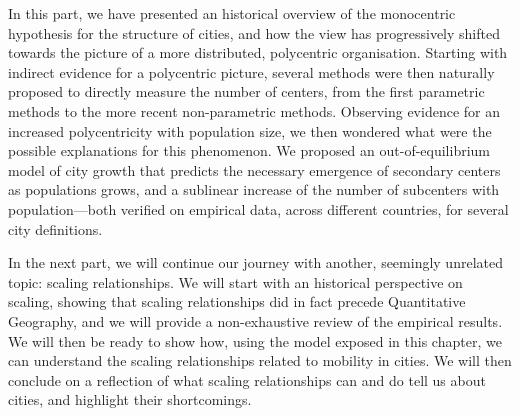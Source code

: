 In this part, we have presented an historical overview of the monocentric
hypothesis for the structure of cities, and how the view has progressively
shifted towards the picture of a more distributed, polycentric organisation.
Starting with indirect evidence for a polycentric picture, several methods were
then naturally proposed to directly measure the number of centers, from the
first parametric methods to the more recent non-parametric methods. Observing
evidence for an increased polycentricity with population size, we then wondered
what were the possible explanations for this phenomenon. We proposed an
out-of-equilibrium model of city growth that predicts the necessary emergence of
secondary centers as populations grows, and a sublinear increase of the number
of subcenters with population---both verified on empirical data, across
different countries, for several city definitions.

In the next part, we will continue our journey with another, seemingly unrelated
topic: scaling relationships. We will start with an historical perspective on
scaling, showing that scaling relationships did in fact precede Quantitative
Geography, and we will provide a non-exhaustive review of the empirical results.
We will then be ready to show how, using the model exposed in this chapter, we
can understand the scaling relationships related to mobility in cities. We will
then conclude on a reflection of what scaling relationships can and do tell us
about cities, and highlight their shortcomings.
